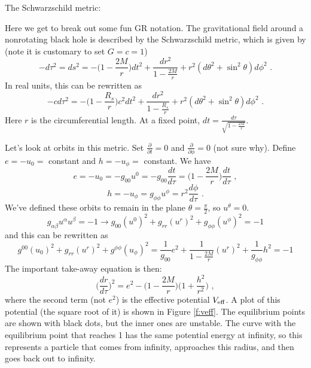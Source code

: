 The Schwarzschild metric:

Here we get to break out some fun GR notation. The gravitational field around a nonrotating black hole is described by the Schwarzschild metric, which is given by (note it is customary to set $G = c = 1$)
\begin{equation}
-d\tau^2 = ds^2 = -\biggl( 1 - \frac{2M}{r} \biggr) dt^2 + \frac{dr^2}{1 - \frac{2M}{r}} + r^2(d\theta^2 + \sin^2\theta) d\phi^2\,\,.
\end{equation}
In real units, this can be rewritten as
\begin{equation}
-c d\tau^2 = -\biggl( 1 - \frac{R_s}{r} \biggr) c^2 dt^2 + \frac{dr^2}{1 - \frac{R_s}{r}} + r^2(d\theta^2 + \sin^2\theta) d\phi^2\,\,.
\end{equation}
Here $r$ is the circumferential length. At a fixed point, $dt = \frac{d\tau}{\sqrt{1 - \frac{2M}{r}}}$. 

Let's look at orbits in this metric. Set $\frac{\partial}{\partial t} = 0$ and $\frac{\partial}{\partial \phi} = 0$ (not sure why). Define $e = -u_0 = $ constant and $h = -u_\phi =$ constant. We have
\begin{equation}
e = -u_0 = -g_{00} u^0 = -g_{00} \frac{dt}{d\tau} = \biggl( 1 - \frac{2M}{r} \biggr) \frac{dt}{d\tau}\,\,,
\end{equation}
\begin{equation}
h = -u_\phi = g_{\phi \phi} u^\phi = r^2 \frac{d\phi}{d\tau}\,\,.
\end{equation}
We've defined these orbits to remain in the plane $\theta = \frac{\pi}{2}$, so $u^\theta = 0$.
\begin{equation}
g_{\alpha \beta}u^\alpha u^\beta = -1 \rightarrow g_{00} (u^0)^2 + g_{rr}(u^r)^2 + g_{\phi \phi} (u^\phi)^2 = -1
\end{equation}
and this can be rewritten as
\begin{equation}
g^{00} (u_0)^2 + g_{rr}(u^r)^2 + g^{\phi \phi} (u_\phi)^2 = \frac{1}{g_{00}} e^2 + \frac{1}{1 - \frac{2M}{r}}(u^r)^2 + \frac{1}{g_{\phi \phi}} h^2 = -1
\end{equation}
The important take-away equation is then:
\begin{equation}
\biggl(\frac{dr}{d\tau} \biggr)^2 = e^2 - \biggl( 1 - \frac{2M}{r} \biggr) \biggl( 1 + \frac{h^2}{r^2} \biggr)\,\,,
\end{equation}
where the second term (not $e^2$) is the effective potential $V_{\rm eff}$. A plot of this potential (the square root of it) is shown in Figure \ref{f:veff}. The equilibrium points are shown with black dots, but the inner ones are unstable. The curve with the equilibrium point that reaches 1 has the same potential energy at infinity, so this represents a particle that comes from infinity, approaches this radius, and then goes back out to infinity.


